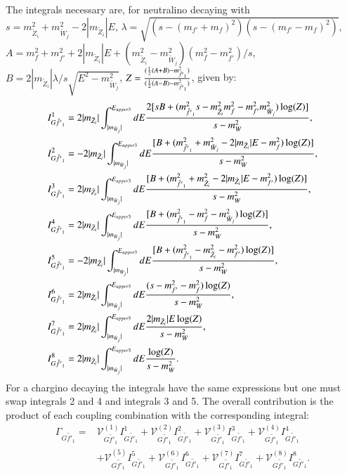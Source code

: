 \documentclass[final,3p,times,pdflatex]{elsarticle}
\begin{document}
The integrals necessary are, for neutralino decaying with \\ $s = m_{\tilde{Z}_i}^2 + m_{\tilde{W}_j}^2 -2|m_{\tilde{Z}_i}|E$,  $\lambda = \sqrt{(s-(m_{f'}+m_{f})^2)(s-(m_{f'}-m_{f})^2)}$, $A = m_{f}^2 + m_{f'}^2 +2|m_{\tilde{Z}_i}|E + (m_{\tilde{Z}_i}^2 - m_{\tilde{W}_j}^2)(m_{f}^2 - m_{f'}^2)/s$, $B = 2|m_{\tilde{Z}_i}|\lambda/s \sqrt{E^2 - m_{\tilde{W}_j}^2} $, $Z = {(\frac{1}{2}(A+B) - m_{\tilde{f'}_1}^2) \over (\frac{1}{2}(A-B) - m_{\tilde{f'}_1}^2)}$, given by:
\begin{align}
I_{G \tilde{f'}_1}^{1} &= 2|m_{\tilde{Z}_i}| \int_{|m_{\tilde{W}_j}|}^{E_{upper3}} dE {2[sB + (m_{\tilde{f'}_1}^2 s - m_{\tilde{Z}_i}^2 m_{f}^2 - m_{f'}^2 m_{\tilde{W}_j}^2)\log(Z)] \over s - m_{W}^2}, \\
I_{G \tilde{f'}_1}^{2} &= -2|m_{\tilde{Z}_i}| \int_{|m_{\tilde{W}_j}|}^{E_{upper3}} dE {[B + (m_{\tilde{f'}_1}^2 + m_{\tilde{W}_j}^2 - 2|m_{\tilde{Z}_i}|E - m_{f}^2)\log(Z)] \over s - m_{W}^2}, \\
I_{G \tilde{f'}_1}^{3} &= 2|m_{\tilde{Z}_i}| \int_{|m_{\tilde{W}_j}|}^{E_{upper3}} dE {[B + (m_{\tilde{f'}_1}^2 + m_{\tilde{Z}_i}^2 - 2|m_{\tilde{Z}_i}|E - m_{f'}^2)\log(Z)] \over s - m_{W}^2}, \\
I_{G \tilde{f'}_1}^{4} &= 2|m_{\tilde{Z}_i}| \int_{|m_{\tilde{W}_j}|}^{E_{upper3}} dE {[B + (m_{\tilde{f'}_1}^2 - m_{f}^2 - m_{\tilde{W}_j}^2)\log(Z)] \over s - m_{W}^2}, \\
I_{G \tilde{f'}_1}^{5} &= -2|m_{\tilde{Z}_i}| \int_{|m_{\tilde{W}_j}|}^{E_{upper3}} dE {[B + (m_{\tilde{f'}_1}^2 - m_{\tilde{Z}_i}^2 - m_{f'}^2)\log(Z)] \over s - m_{W}^2}, \\
I_{G \tilde{f'}_1}^{6} &= 2|m_{\tilde{Z}_i}| \int_{|m_{\tilde{W}_j}|}^{E_{upper3}} dE {(s-m_{f'}^2-m_{f}^2)\log(Z) \over s - m_{W}^2}, \\
I_{G \tilde{f'}_1}^{7} &= 2|m_{\tilde{Z}_i}| \int_{|m_{\tilde{W}_j}|}^{E_{upper3}} dE {2|m_{\tilde{Z}_i}|E \log(Z) \over s - m_{W}^2}, \\
I_{G \tilde{f'}_1}^{8} &= 2|m_{\tilde{Z}_i}| \int_{|m_{\tilde{W}_j}|}^{E_{upper3}} dE {\log(Z) \over s - m_{W}^2}.
\end{align}
For a chargino decaying the integrals have the same expressions but one must
swap integrals 2 and 4 and integrals 3 and 5. The overall contribution is the product of each coupling combination with the corresponding integral:
\begin{equation}
\begin{aligned}
\Gamma_{G \tilde{f'}_1} = & \mathcal{V}_{G \tilde{f'}_1}^{(1)} I_{G \tilde{f'}_1}^{1} + \mathcal{V}_{G \tilde{f'}_1}^{(2)} I_{G \tilde{f'}_1}^{2} + \mathcal{V}_{G \tilde{f'}_1}^{(3)} I_{G \tilde{f'}_1}^{3} + \mathcal{V}_{G \tilde{f'}_1}^{(4)} I_{G \tilde{f'}_1}^{4} \\ & + \mathcal{V}_{G \tilde{f'}_1}^{(5)} I_{G \tilde{f'}_1}^{5} + \mathcal{V}_{G \tilde{f'}_1}^{(6)} I_{G \tilde{f'}_1}^{6} + \mathcal{V}_{G \tilde{f'}_1}^{(7)} I_{G \tilde{f'}_1}^{7} + \mathcal{V}_{G \tilde{f'}_1}^{(8)} I_{G \tilde{f'}_1}^{8}.
\end{aligned}
\end{equation}
\end{document}
